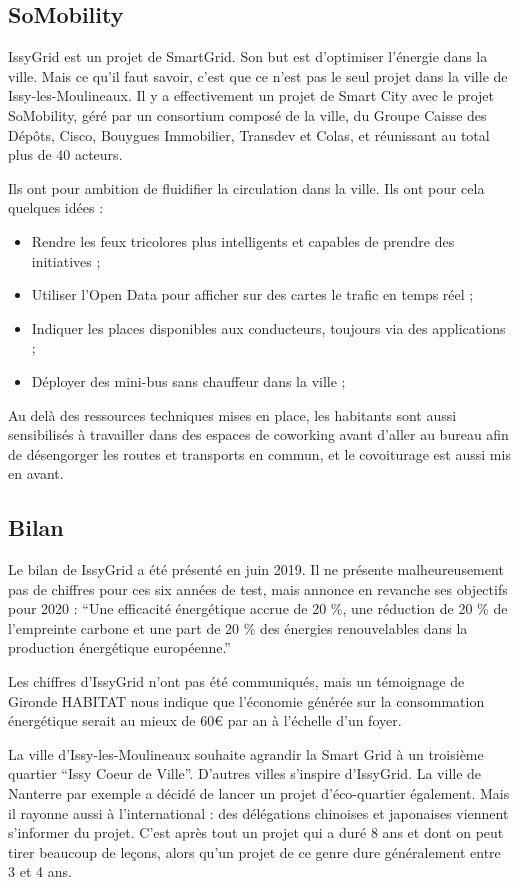 \subsection{SoMobility}
IssyGrid est un projet de SmartGrid. Son but est d'optimiser l'énergie dans la ville.
Mais ce qu'il faut savoir, c'est que ce n'est pas le seul projet dans la ville de Issy-les-Moulineaux.
Il y a effectivement un projet de Smart City avec le projet SoMobility, géré par un consortium composé de
la ville, du Groupe Caisse des Dépôts, Cisco, Bouygues Immobilier, Transdev et Colas, et réunissant au total plus de 40 acteurs.

Ils ont pour ambition de fluidifier la circulation dans la ville.
Ils ont pour cela quelques idées :
\begin{itemize}
    \item Rendre les feux tricolores plus intelligents et capables de prendre des initiatives ;
    \item Utiliser l'Open Data pour afficher sur des cartes le trafic en temps réel ;
    \item Indiquer les places disponibles aux conducteurs, toujours via des applications ;
    \item Déployer des mini-bus sans chauffeur dans la ville ;
\end{itemize}

Au delà des ressources techniques mises en place, les habitants sont aussi sensibilisés à travailler
dans des espaces de coworking avant d'aller au bureau afin de désengorger les routes et transports
en commun, et le covoiturage est aussi mis en avant.

\subsection{Bilan}
Le bilan de IssyGrid a été présenté en juin 2019.
Il ne présente malheureusement pas de chiffres pour ces six années de test, mais annonce en revanche
ses objectifs pour 2020 : ``Une efficacité énergétique accrue de 20 \%, une réduction de 20 \%
de l’empreinte carbone et une part de 20 \% des énergies renouvelables dans la production
énergétique européenne.''

Les chiffres d'IssyGrid n'ont pas été communiqués, mais un témoignage de Gironde HABITAT nous indique
que l'économie générée sur la consommation énergétique serait au mieux de 60€ par an à l'échelle d'un
foyer.

La ville d'Issy-les-Moulineaux souhaite agrandir la Smart Grid à un troisième quartier
``Issy Coeur de Ville''.
D'autres villes s'inspire d'IssyGrid. La ville de Nanterre par exemple a décidé de lancer un projet
d'éco-quartier également. Mais il rayonne aussi à l'international : des délégations
chinoises et japonaises viennent s'informer du projet.
C'est après tout un projet qui a duré 8 ans et dont on peut tirer beaucoup de leçons,
alors qu'un projet de ce genre dure généralement entre 3 et 4 ans.

